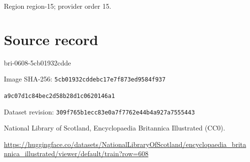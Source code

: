 \documentclass[11pt]{article}
\begin{document}
{\scriptsize\color{gray} Region region-15; provider order 15.\par}
\medskip
\newpage\section*{Source record}
bri-0608-5cb01932cdde\par
Image SHA-256: \texttt{5cb01932cddebc17e7f873ed9584f937}\par\texttt{a9c07d1c84bec2d58b28d1c0620146a1}\par
Dataset revision: \texttt{309f765b1ecc83e0a7f7}\texttt{762e44b4a927a7555443}\par
National Library of Scotland, Encyclopaedia Britannica Illustrated (CC0).\par
\url{https://huggingface.co/datasets/NationalLibraryOfScotland/encyclopaedia_britannica_illustrated/viewer/default/train?row=608}
\end{document}
